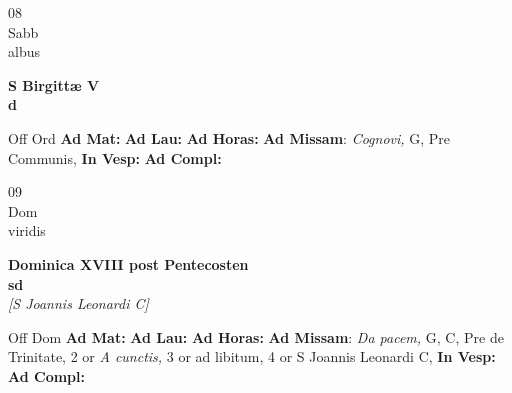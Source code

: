 \documentclass[10pt, openany]{book}
\begin{document}
        \begin{center}
            \begin{minipage}{3.5in}
                \vspace{2em}
                \begin{minipage}{0.5in}
                    {\Huge 08} \\
                    {\normalsize Sabb} \\
                    {\normalsize albus}
                \end{minipage}
                \begin{minipage}{3.0in}
                    \textbf{ \large S Birgittæ V \\
                    \textnormal{\normalsize d}} \\ 
                \end{minipage}
                \begin{justify}Off Ord
                    \textbf{Ad Mat: }
                    \textbf{Ad Lau: }
                    \textbf{Ad Horas: }\textbf{Ad Missam}: \textit{Cognovi,} G, Pre Communis,  
                    \textbf{In Vesp: }
                    \textbf{Ad Compl: }
                \end{justify}
            \end{minipage}
        \end{center}
    
        \begin{center}
            \begin{minipage}{3.5in}
                \vspace{2em}
                \begin{minipage}{0.5in}
                    {\Huge 09} \\
                    {\normalsize Dom} \\
                    {\normalsize viridis}
                \end{minipage}
                \begin{minipage}{3.0in}
                    \textbf{ \large Dominica XVIII post Pentecosten \\
                    \textnormal{\normalsize sd}} \\ \textit{[S Joannis Leonardi C]} \\ 
                \end{minipage}
                \begin{justify}Off Dom
                    \textbf{Ad Mat: }
                    \textbf{Ad Lau: }
                    \textbf{Ad Horas: }\textbf{Ad Missam}: \textit{Da pacem,} G, C, Pre de Trinitate, 2 or \textit{A cunctis,} 3 or ad libitum, 4 or S Joannis Leonardi C,  
                    \textbf{In Vesp: }
                    \textbf{Ad Compl: }
                \end{justify}
            \end{minipage}
        \end{center}
    
\end{document}
